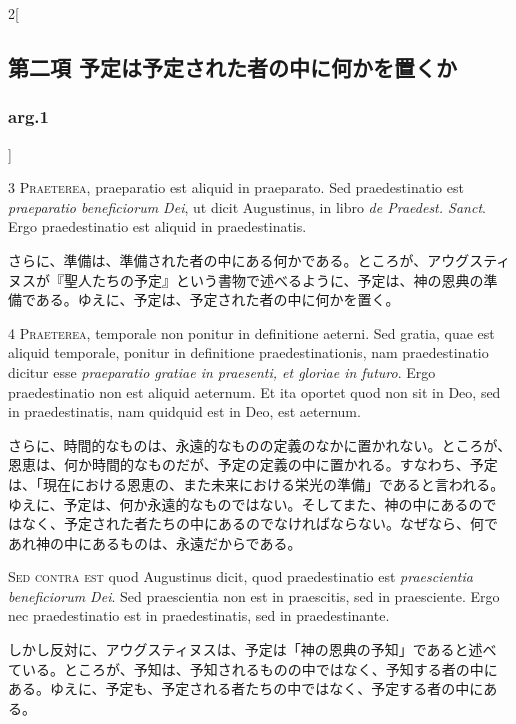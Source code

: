 \documentclass[paper=a4paper,fontsize=10pt,jafontsize=9pt,titlepage]{jlreq}
\begin{document}
\begin{paracol}{2}[\subsection{第二項 予定は予定された者の中に何かを置くか}\subsubsection{arg.1}]


{\scshape 3 Praeterea}, praeparatio est aliquid in
praeparato. Sed praedestinatio est {\itshape praeparatio beneficiorum Dei}, ut
dicit Augustinus, in libro {\itshape  de Praedest. Sanct}. Ergo praedestinatio est
aliquid in praedestinatis.


\switchcolumn


さらに、準備は、準備された者の中にある何かである。ところが、アウグスティ
ヌスが『聖人たちの予定』という書物で述べるように、予定は、神の恩典の準
備である。ゆえに、予定は、予定された者の中に何かを置く。




{\scshape  4 Praeterea}, temporale non ponitur in
definitione aeterni. Sed gratia, quae est aliquid temporale, ponitur in
definitione praedestinationis, nam praedestinatio dicitur esse
{\itshape praeparatio gratiae in praesenti, et gloriae in futuro}. Ergo
praedestinatio non est aliquid aeternum. Et ita oportet quod non sit in
Deo, sed in praedestinatis, nam quidquid est in Deo, est aeternum.


\switchcolumn


さらに、時間的なものは、永遠的なものの定義のなかに置かれない。ところが、
恩恵は、何か時間的なものだが、予定の定義の中に置かれる。すなわち、予定
は、「現在における恩恵の、また未来における栄光の準備」であると言われる。
ゆえに、予定は、何か永遠的なものではない。そしてまた、神の中にあるので
はなく、予定された者たちの中にあるのでなければならない。なぜなら、何で
あれ神の中にあるものは、永遠だからである。


\switchcolumn*[\subsubsection{s.c.}]


{\scshape  Sed contra est} quod Augustinus dicit, quod
praedestinatio est {\itshape praescientia beneficiorum Dei}. Sed praescientia non
est in praescitis, sed in praesciente. Ergo nec praedestinatio est in
praedestinatis, sed in praedestinante.


\switchcolumn


しかし反対に、アウグスティヌスは、予定は「神の恩典の予知」であると述べ
ている。ところが、予知は、予知されるものの中ではなく、予知する者の中に
ある。ゆえに、予定も、予定される者たちの中ではなく、予定する者の中にあ
る。



\end{paracol}
\end{document}
